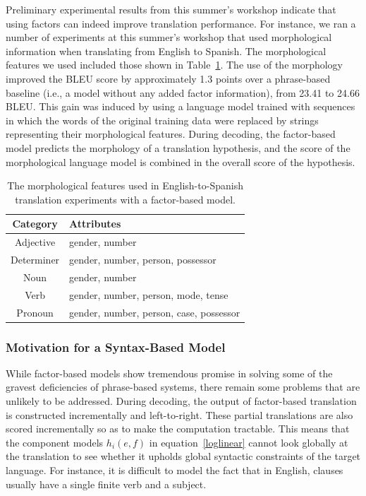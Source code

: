 \documentclass[10pt]{report}
\theoremstyle{plain}
\begin{document}
{Preliminary experimental results from this summer's workshop indicate
that using factors can indeed improve translation performance. For
instance, we ran a number of experiments at this summer's workshop
that used morphological information when translating from English to
Spanish. The morphological features we used included those shown in
Table~\ref{morph}. The use of the morphology improved the BLEU score
by approximately 1.3 points over a phrase-based baseline (i.e., a
model without any added factor information), from 23.41 to 24.66
BLEU. This gain was induced by using a language model trained with
sequences in which the words of the original training data were
replaced by strings representing their morphological features. During
decoding, the factor-based model predicts the morphology of a
translation hypothesis, and the score of the morphological language
model is combined in the overall score of the hypothesis.

\begin{table}
\begin{center}
\begin{tabular}{|c|l|}
\hline
{\bf Category} & {\bf Attributes} \\
\hline
Adjective & gender, number \\
\hline
Determiner & gender, number, person, possessor \\
\hline
Noun & gender, number \\
\hline
Verb & gender, number, person, mode, tense \\
\hline
Pronoun & gender, number, person, case, possessor \\
\hline
\end{tabular}
\end{center}
\caption{The morphological features used in English-to-Spanish
translation experiments with a factor-based model.}
\label{morph}
\end{table}

\subsubsection{Motivation for a Syntax-Based Model}
While factor-based models show tremendous promise in solving some of
the gravest deficiencies of phrase-based systems, there remain some
problems that are unlikely to be addressed. During decoding, the
output of factor-based translation is constructed incrementally and
left-to-right. These partial translations are also scored
incrementally so as to make the computation tractable. This means that
the component models $h_i(e,f)$ in equation~\ref{loglinear} cannot
look globally at the translation to see whether it upholds global
syntactic constraints of the target language. For instance, it is
difficult to model the fact that in English, clauses usually have a
single finite verb and a subject.

}
\end{document}
